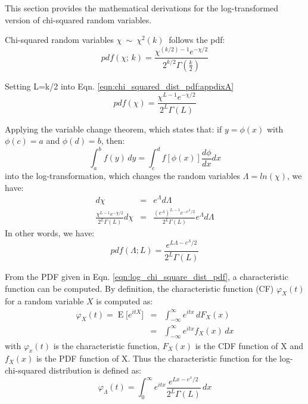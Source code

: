 \documentclass[journal,12pt,draftcls,onecolumn]{IEEEtran}
\begin{document}
This section provides the mathematical derivations for the log-transformed version of chi-squared random variables.

Chi-squared random variables $\chi\ \sim\ \chi^2(k)\ $ follows the pdf:
\begin{equation}
pdf(\chi;\,k) =
  \frac{\chi^{(k/2)-1} e^{-\chi/2}}{2^{k/2} \Gamma\left(\frac{k}{2}\right)}  
\label{eqn:chi_squared_dist_pdf:appdixA}
\end{equation}

Setting L=k/2 into Eqn. \ref{eqn:chi_squared_dist_pdf:appdixA}
\begin{equation}
pdf(\chi) = \frac{\chi^{L-1}e^{-\chi/2}}{2^L\Gamma(L)}
\end{equation}

Applying the variable change theorem, which states that: if $y=\phi(x)$ with $\phi(c)=a$ and $\phi(d)=b$, then:
\begin{equation}
 \int_a^b \! f(y) \, dy = \int_c^d \! f[\phi(x)] \frac{d\phi}{dx} dx
\end{equation}
into the log-transformation, which changes the random variables $\Lambda=ln(\chi)$, we have:
\begin{eqnarray*}
  d\chi &=& e^\Lambda d\Lambda \\
  \frac{\chi^{L-1}e^{-\chi/2}}{2^L\Gamma(L)} d\chi &=&  \frac{(e^\Lambda)^{L-1}e^{-e^\Lambda/2}}{2^L\Gamma(L)} e^\Lambda d\Lambda
\end{eqnarray*}
In other words, we have:
\begin{equation}
pdf(\Lambda;L) = \frac{e^{L \Lambda -e^\Lambda/2}}{2^L\Gamma(L)}
\label{eqn:log_chi_square_dist_pdf}
\end{equation}

From the PDF given in Eqn. \ref{eqn:log_chi_square_dist_pdf}, a characteristic function can be computed.
By definition, the characteristic function (CF) $\varphi_X(t)$ for a random variable $X$ is computed as:
\begin{eqnarray*}
\varphi_X(t) = \operatorname{E}\big[e^{itX}\big] 
      &=& \int_{-\infty}^\infty e^{itx}\,dF_X(x) \\ 
      &=& \int_{-\infty}^\infty e^{itx} f_X(x)\,dx 
\end{eqnarray*}
with $\varphi_x(t)$ is the characteristic function,
     $F_X(x)$ is the CDF function of X and
     $f_X(x)$ is the PDF function of X.
Thus the characteristic function for the log-chi-squared distribution is defined as: 
\begin{equation}
\varphi_\Lambda(t)=\int_0^\infty e^{itx} \frac{e^{Lx-e^x/2}}{2^L \Gamma(L)}\,dx 
\end{equation}
\end{document}
